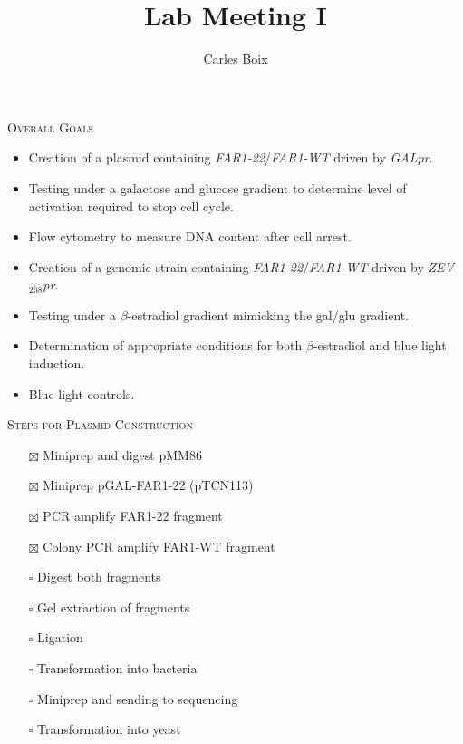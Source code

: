 \documentclass{beamer}
\title[Lab Meeting I]{Lab Meeting I}
\author{Carles Boix}
\begin{document}
\begin{frame}
    \begin{center}
        {\large \textsc{Overall Goals}}
    \end{center}
        \small
    \begin{minipage}[ht!]{0.49\textwidth}
        \begin{itemize}
            \item Creation of a plasmid containing \emph{FAR1-22}/\emph{FAR1-WT} driven by \emph{GALpr}.
            \item Testing under a galactose and glucose gradient to determine level of activation required to stop cell cycle.
            \item Flow cytometry to measure DNA content after cell arrest.
        \end{itemize}
    \end{minipage}
    \hfill
    \begin{minipage}[ht!]{0.49\textwidth}
        \begin{itemize}
            \item Creation of a genomic strain containing \emph{FAR1-22}/\emph{FAR1-WT} driven by \emph{ZEV}$_{268}$\emph{pr}.
            \item Testing under a $\beta$-estradiol gradient mimicking the gal/glu gradient.
            \item Determination of appropriate conditions for both $\beta$-estradiol and blue light induction.
            \item Blue light controls.
        \end{itemize}
    \end{minipage}
\end{frame}

\begin{frame}
    \begin{center}
        {\large \textsc{Steps for Plasmid Construction}}
    \end{center}
        \begin{itemize}
            \item[$\boxtimes$]  Miniprep and digest pMM86
            \item[$\boxtimes$]  Miniprep pGAL-FAR1-22 (pTCN113)
            \item[$\boxtimes$]  PCR amplify FAR1-22 fragment
            \item[$\boxtimes$]  Colony PCR amplify FAR1-WT fragment
            \item[$\square$]  Digest both fragments
            \item[$\square$]  Gel extraction of fragments
            \item[$\square$]  Ligation 
            \item[$\square$] Transformation into bacteria
            \item[$\square$] Miniprep and sending to sequencing
            \item[$\square$] Transformation into yeast
        \end{itemize}
\end{frame}
\end{document}
